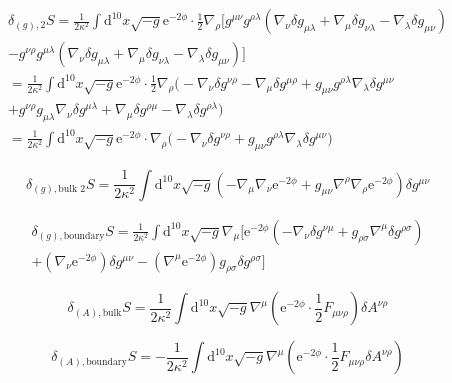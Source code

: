 \begin{gather*}
	\delta_{(g),\text{2}} S = \frac{1}{2\kappa^2}\int \mathrm{d}^{10}x
	\sqrt{-g} \mathrm{e}^{-2\phi} \cdot \frac{1}{2} \nabla_\rho
	\bigg[ g^{\mu\nu} g^{\rho\lambda}
		(\nabla_\nu \delta g_{\mu\lambda} + \nabla_\mu \delta g_{\nu\lambda} - \nabla_\lambda \delta g_{\mu\nu})
		\\
		- g^{\nu\rho} g^{\mu\lambda}
	(\nabla_\nu \delta g_{\mu\lambda} + \nabla_\mu \delta g_{\nu\lambda} - \nabla_\lambda \delta g_{\mu\nu}) \bigg]
	\\
	 = \frac{1}{2\kappa^2}\int \mathrm{d}^{10}x
	\sqrt{-g} \mathrm{e}^{-2\phi} \cdot \frac{1}{2} \nabla_\rho
	\bigg( -\nabla_\nu \delta g^{\nu\rho} - \nabla_\mu \delta g^{\mu\rho}
		+g_{\mu\nu}g^{\rho\lambda} \nabla_\lambda \delta g^{\mu\nu}
		\\
		+ g^{\nu\rho} g_{\mu\lambda} \nabla_\nu \delta g^{\mu\lambda}
	+ \nabla_\mu \delta g^{\rho\mu} - \nabla_\lambda \delta g^{\rho\lambda} \bigg)
	\\
	 = \frac{1}{2\kappa^2}\int \mathrm{d}^{10}x
	\sqrt{-g} \mathrm{e}^{-2\phi} \cdot  \nabla_\rho
	\bigg( -\nabla_\nu \delta g^{\nu\rho} 
	+g_{\mu\nu}g^{\rho\lambda} \nabla_\lambda \delta g^{\mu\nu}\bigg)
\end{gather*}

\begin{equation*}
	\delta_{(g),\text{bulk 2}} S= \frac{1}{2\kappa^2} \int \mathrm{d}^{10}x
	\sqrt{-g} \left( -\nabla_\mu \nabla_\nu \mathrm{e}^{-2\phi}
		+ g_{\mu\nu} \nabla^\rho \nabla_\rho \mathrm{e}^{-2\phi}
	\right)\delta g^{\mu\nu} 
\end{equation*}

\begin{gather*}
	\delta_{(g),\text{boundary}} S =  \frac{1}{2\kappa^2} \int \mathrm{d}^{10} x \sqrt{-g}
	\nabla_\mu \bigg[\mathrm{e}^{-2\phi} 
	( -\nabla_\nu \delta g^{\nu\mu} 
	+g_{\rho\sigma}\nabla^\mu \delta g^{\rho\sigma})
	\\
	+ (\nabla_\nu \mathrm{e}^{-2\phi}) \delta g^{\mu\nu}
	- (\nabla^\mu \mathrm{e}^{-2\phi}) g_{\rho\sigma}\delta g^{\rho\sigma}
  \bigg] 
\end{gather*}

\begin{equation*}
	\delta_{(A),\text{bulk}} S = \frac{1}{2\kappa^2} \int \mathrm{d}^{10}x \sqrt{-g}
	\nabla^\mu \left( \mathrm{e}^{-2\phi} \cdot \frac{1}{2}
	F_{\mu\nu\rho}\right) \delta A^{\nu\rho}
\end{equation*}

\begin{equation*}
	\delta_{(A),\text{boundary}} S =- \frac{1}{2\kappa^2} \int \mathrm{d}^{10}x \sqrt{-g}
	\nabla^\mu \left( \mathrm{e}^{-2\phi} \cdot \frac{1}{2}
	F_{\mu\nu\rho}\delta A^{\nu\rho}\right) 
\end{equation*}

